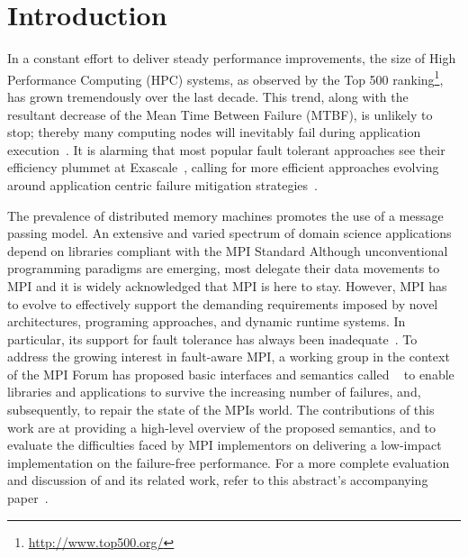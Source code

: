 \section{Introduction}
\label{sect:intro}

In a constant effort to deliver steady performance improvements, the size of
High Performance Computing (HPC) systems, as observed by the Top 500
ranking\footnote{\url{http://www.top500.org/}}, has grown tremendously over the
last decade. This trend, along with the resultant decrease of the Mean Time 
Between Failure (MTBF), is unlikely to stop; thereby many computing nodes will 
inevitably fail during application execution~\cite{ExaScaleResilience09}. It is alarming 
that most popular fault tolerant approaches see their efficiency plummet at 
Exascale~\cite{BOSILCA-2012-696154,lawn265}, calling for more efficient
approaches evolving around application centric failure 
mitigation strategies~\cite{huang1984algorithm}.

The prevalence of distributed memory machines promotes the use of a message
passing model. An extensive and varied spectrum of domain science applications
depend on libraries compliant with the MPI 
Standard
Although unconventional programming paradigms are
emerging, most delegate their data movements to MPI and it is widely acknowledged that 
MPI is here to stay. However, MPI has to evolve to effectively support the demanding 
requirements imposed by novel architectures, programing approaches, and dynamic runtime
systems. In particular, its support for fault tolerance 
has always been inadequate~\cite{Gropp:2004:FTM:1080704.1080714}. To address
the growing interest in fault-aware MPI, a working group  in the
context of the MPI Forum has proposed basic interfaces and semantics called 
\ulfm~\cite{BlandULFMTechReport} to enable libraries and applications to survive
the increasing number of failures, and, subsequently, to repair the 
state of the MPIs world. The contributions of this work are
at providing a high-level overview of the proposed semantics, and to evaluate
the difficulties faced by MPI implementors on delivering a low-impact
implementation on the failure-free performance.
For a more 
complete evaluation and discussion of \ulfm and its related work, refer to this 
abstract's accompanying paper~\cite{Bland:2012tp}.
